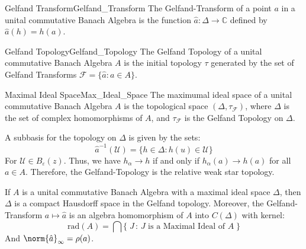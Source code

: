         \begin{ldefinition}{Gelfand Transform}{Gelfand_Transform}
            The Gelfand-Transform of a point $a$ in a unital
            commutative Banach Algebra is the function
            $\hat{a}:\Delta\rightarrow\mathbb{C}$ defined by
            $\hat{a}(h)=h(a)$.
        \end{ldefinition}
        \begin{ldefinition}{Gelfand Topology}{Gelfand_Topology}
            The Gelfand Topology of a unital commutative
            Banach Algebra $A$ is the initial topology $\tau$
            generated by the set of Gelfand Transforms
            $\mathscr{F}=\{\hat{a}:a\in{A}\}$.
        \end{ldefinition}
        \begin{ldefinition}{Maximal Ideal Space}{Max_Ideal_Space}
            The maximumal ideal space of a unital commutative
            Banach Algebra $A$ is the topological space
            $(\Delta,\tau_{\mathscr{F}})$, where $\Delta$ is the
            set of complex homomorphisms of $A$, and
            $\tau_{\mathscr{F}}$ is the Gelfand Topology on
            $\Delta$.
        \end{ldefinition}
        A subbasis for the topology on $\Delta$ is given by
        the sets:
        \begin{equation}
            \hat{a}^{\minus{1}}(\mathcal{U})
            =\{h\in\Delta:h(u)\in\mathcal{U}\}
        \end{equation}
        For $\mathcal{U}\in{B}_{\varepsilon}(z)$. Thus, we have
        $h_{\alpha}\rightarrow{h}$ if and only if
        $h_{\alpha}(a)\rightarrow{h}(a)$ for all $a\in{A}$.
        Therefore, the Gelfand-Topology is the relative weak
        star topology.
        \begin{theorem}
            If $A$ is a unital commutative Banach Algebra
            with a maximal ideal space $\Delta$, then $\Delta$
            is a compact Hausdorff space in the Gelfand
            topology. Moreover, the Gelfand-Transform
            $a\mapsto\hat{a}$ is an algebra homomorphism of
            $A$ into $C(\Delta)$ with kernel:
            \begin{equation}
                \mathrm{rad}(A)=\bigcap\{\;J\,:\,
                    J\textrm{ is a Maximal Ideal of }A\;\}
            \end{equation}
            And $\norm{\hat{a}}_{\infty}=\rho(a)$.
        \end{theorem}

